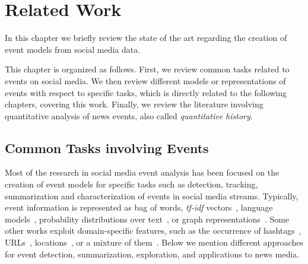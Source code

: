 \chapter{Related Work}


In this chapter we briefly review the state of the art regarding the creation of
event models from social media data.
%

This chapter is organized as follows. 
%
First, we review common tasks related to events on social media. 
%
We then review different models or representations of events with respect to
specific tasks, which is directly related to the following chapters, covering
this work. 
%
Finally, we review the literature involving quantitative analysis of news
events, also called {\em quantitative history}.



\section{Common Tasks involving Events}

Most of the research in social media event analysis has been focused on the
creation of event models for specific tasks such as detection, tracking,
summarization and characterization of events in social media streams. 
%
Typically, event information is represented as bag of words, {\em tf-idf}
vectors~\cite{tfidf,Marcus:2011:TAV:1978942.1978975}, language
models~\cite{zellers2019neuralfakenews}, probability distributions over
text~\cite{o2010tweetmotif,Hong:2010:EST:1964858.1964870,zhao2011comparing,Mehrotra:2013:ILT:2484028.2484166},
or graph
representations~\cite{Setty:2018:ENE:3209978.3210136,Lee:2013:KSK:2487575.2487711,Lee:2014:CCS:2661829.2661859}.
%
Some other works exploit domain-specific features, such as the occurrence of
hashtags~\cite{Kamath:2013:SDO:2488388.2488447},
URLs~\cite{Alonso:2015:WCW:2740908.2745397},
locations~\cite{Abdelhaq:EvenTweet:2013}, or a mixture of
them~\cite{castillo2011information}.
%
Below we mention different approaches for event detection, summarization,
exploration, and applications to news media.
%



